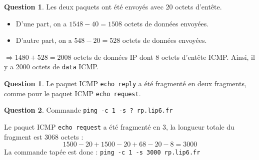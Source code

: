 \documentclass[11pt,english,french]{scrreprt}
\theoremstyle{remark}
\theoremstyle{definition}
\newtheorem{ques}{Question}[section]
\newtheorem{ques*}{Question}[subsection]
\begin{document}
\begin{ques*}
	Les deux paquets ont été envoyés avec 20 octets d'entête.\begin{itemize}
		\item D'une part, on a $1548 - 40 = 1508$ octets de données envoyées.
		\item D'autre part, on a $548 - 20 = 528$ octets de données envoyées.
	\end{itemize}

	 $\Rightarrow 1480 + 528 = 2008$ octets de données IP dont 8 octets d'entête ICMP. Ainsi, il y a 2000 octets de \lstinline!data! ICMP.
\end{ques*}

\setcounter{ques}{7}
\begin{ques}
	Le paquet ICMP \lstinline!echo reply! a été fragmenté en deux fragments, comme pour le paquet ICMP \lstinline!echo request!.
\end{ques}

\begin{ques}
	Commande \lstinline!ping -c 1 -s ? rp.lip6.fr!
	
	Le paquet ICMP \lstinline!echo request! a été fragmenté en 3, la longueur totale du fragment est 3068 octets : \[1500-20+1500-20+68-20-8 = 3000\]
	La commande tapée est donc : \lstinline!ping -c 1 -s 3000 rp.lip6.fr!
\end{ques}
\end{document}
